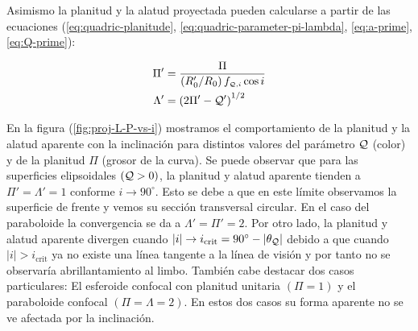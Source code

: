 Asimismo la planitud y la alatud proyectada pueden calcularse a partir de las ecuaciones (\ref{eq:quadric-planitude}, \ref{eq:quadric-parameter-pi-lambda}, \ref{eq:a-prime}, \ref{eq:Q-prime}):

\begin{align}
  \Pi' &= \frac{\Pi}{\left(R'_0/R_0\right)f_{\scriptscriptstyle \mathcal{Q}, i}\cos i}\\
  \Lambda' &= \left(2\Pi' - \mathcal{Q}'\right)^{1/2}
\end{align}

En la figura (\ref{fig:proj-L-P-vs-i}) mostramos el comportamiento de la planitud y la alatud aparente con la inclinación para distintos valores del parámetro $\mathcal{Q}$ (color) y de la planitud $\Pi$ (grosor de la curva). Se puede observar que para las superficies elipsoidales $(\mathcal{Q} > 0)$, la planitud y alatud aparente tienden a $\Pi' = \Lambda' = 1$ conforme $i \to 90^\circ$. Esto se debe a que en este límite observamos la superficie de frente y vemos su sección transversal circular. En el caso del paraboloide la convergencia se da a $\Lambda' = \Pi' = 2$. Por otro lado, la planitud y alatud aparente divergen cuando $|i| \to i_{\mathrm{crit}} = 90^\circ - |\theta_{\mathcal{Q}}|$ debido a que cuando $|i| > i_{\mathrm{crit}}$ ya no existe una línea tangente a la línea de visión y por tanto no se observaría abrillantamiento al limbo. También cabe destacar dos casos particulares: El esferoide confocal con planitud unitaria $(\Pi = 1)$ y el paraboloide confocal $(\Pi = \Lambda = 2)$. En estos dos casos su forma aparente no se ve afectada por la inclinación.

